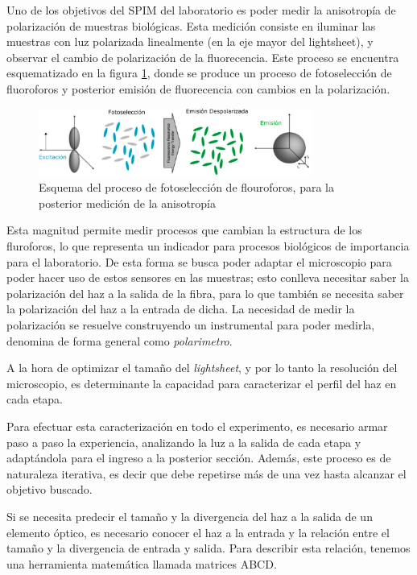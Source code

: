 Uno de los objetivos del SPIM del laboratorio es poder medir la anisotropía de polarización de muestras biológicas. Esta medición consiste en iluminar las muestras con luz polarizada linealmente (en la eje mayor del lightsheet), y observar el cambio de polarización de la fluorecencia. Este proceso se encuentra esquematizado en la figura \ref{fig:fotoseleccion}, donde se produce un proceso de fotoselección de fluoroforos y posterior emisión de fluorecencia con cambios en la polarización.

\begin{figure}[H]
    \centering
    \includegraphics[width=0.8\textwidth]{fig/fotoseleccion}
    \caption{Esquema del proceso de fotoselección de flouroforos, para la posterior medición de la anisotropía}
    \label{fig:fotoseleccion}
\end{figure}

Esta magnitud permite medir procesos que cambian la estructura de los fluroforos, lo que representa un indicador para procesos biológicos de importancia para el laboratorio. De esta forma se busca poder adaptar el microscopio para poder hacer uso de estos sensores en las muestras; esto conlleva necesitar saber la polarización del haz a la salida de la fibra, para lo que también se necesita saber la polarización del haz a la entrada de dicha. La necesidad de medir la polarización se resuelve construyendo un instrumental para poder medirla, denomina de forma general como \emph{polarimetro}.

A la hora de optimizar el tamaño del \textit{lightsheet}, y por lo tanto la resolución del microscopio, es determinante la capacidad para caracterizar el perfil del haz en cada etapa.

Para efectuar esta caracterización en todo el experimento, es necesario armar paso a paso la experiencia, analizando la luz a la salida de cada etapa y adaptándola para el ingreso a la posterior sección. Además, este proceso es de naturaleza iterativa, es decir que debe repetirse más de una vez hasta alcanzar el objetivo buscado.

Si se necesita predecir el tamaño y la divergencia del haz a la salida de un elemento óptico, es necesario conocer el haz a la entrada y la relación entre el tamaño y la divergencia de entrada y salida. Para describir esta relación, tenemos una herramienta matemática llamada matrices ABCD\cite{svelto}.

